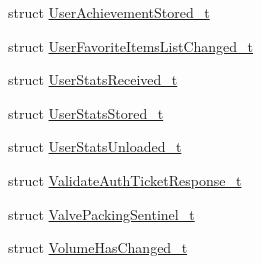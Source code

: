 \begin{DoxyCompactItemize}
\item 
struct \hyperlink{structValve_1_1Steamworks_1_1UserAchievementStored__t}{User\+Achievement\+Stored\+\_\+t}
\item 
struct \hyperlink{structValve_1_1Steamworks_1_1UserFavoriteItemsListChanged__t}{User\+Favorite\+Items\+List\+Changed\+\_\+t}
\item 
struct \hyperlink{structValve_1_1Steamworks_1_1UserStatsReceived__t}{User\+Stats\+Received\+\_\+t}
\item 
struct \hyperlink{structValve_1_1Steamworks_1_1UserStatsStored__t}{User\+Stats\+Stored\+\_\+t}
\item 
struct \hyperlink{structValve_1_1Steamworks_1_1UserStatsUnloaded__t}{User\+Stats\+Unloaded\+\_\+t}
\item 
struct \hyperlink{structValve_1_1Steamworks_1_1ValidateAuthTicketResponse__t}{Validate\+Auth\+Ticket\+Response\+\_\+t}
\item 
struct \hyperlink{structValve_1_1Steamworks_1_1ValvePackingSentinel__t}{Valve\+Packing\+Sentinel\+\_\+t}
\item 
struct \hyperlink{structValve_1_1Steamworks_1_1VolumeHasChanged__t}{Volume\+Has\+Changed\+\_\+t}
\end{DoxyCompactItemize}
